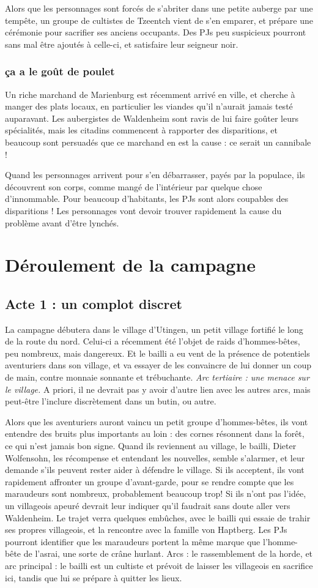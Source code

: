 \documentclass[10pt,a4paper]{book}
\begin{document}
Alors que les personnages sont forcés de s'abriter dans une petite auberge par une tempête, un groupe de cultistes de Tzeentch vient de s'en emparer, et prépare une cérémonie pour sacrifier ses anciens occupants. Des PJs peu suspicieux pourront sans mal être ajoutés à celle-ci, et satisfaire leur seigneur noir.
\subsection{ça a le goût de poulet}
Un riche marchand de Marienburg est récemment arrivé en ville, et cherche à manger des plats locaux, en particulier les viandes qu'il n'aurait jamais testé auparavant. Les aubergistes de Waldenheim sont ravis de lui faire goûter leurs spécialités, mais les citadins commencent à rapporter des disparitions, et beaucoup sont persuadés que ce marchand en est la cause : ce serait un cannibale !

Quand les personnages arrivent pour s'en débarrasser, payés par la populace, ils découvrent son corps, comme mangé de l'intérieur par quelque chose d'innommable. Pour beaucoup d'habitants, les PJs sont alors coupables des disparitions ! Les personnages vont devoir trouver rapidement la cause du problème avant d'être lynchés.
\chapter{Déroulement de la campagne}
\section{Acte 1 : un complot discret}
La campagne débutera dans le village d'Utingen, un petit village fortifié le long de la route du nord. Celui-ci a récemment été l'objet de raids d'hommes-bêtes, peu nombreux, mais dangereux. Et le bailli a eu vent de la présence de potentiels aventuriers dans son village, et va essayer de les convaincre de lui donner un coup de main, contre monnaie sonnante et trébuchante. \emph{Arc tertiaire : une menace sur le village.} A priori, il ne devrait pas y avoir d'autre lien avec les autres arcs, mais peut-être l'inclure discrètement dans un butin, ou autre. 

Alors que les aventuriers auront vaincu un petit groupe d'hommes-bêtes, ils vont entendre des bruits plus importants au loin : des cornes résonnent dans la forêt, ce qui n'est jamais bon signe. Quand ils reviennent au village, le bailli, Dieter Wolfensohn, les récompense et entendant les nouvelles, semble s'alarmer, et leur demande s'ils peuvent rester aider à défendre le village. Si ils acceptent, ils vont rapidement affronter un groupe d'avant-garde, pour se rendre compte que les maraudeurs sont nombreux, probablement beaucoup trop! Si ils n'ont pas l'idée, un villageois apeuré devrait leur indiquer qu'il faudrait sans doute aller vers Waldenheim. Le trajet verra quelques embûches, avec le bailli qui essaie de trahir ses propres villageois, et la rencontre avec la famille von Haptberg. Les PJs pourront identifier que les maraudeurs portent la même marque que l'homme-bête de l'asrai, une sorte de crâne hurlant. Arcs : le rassemblement de la horde, et arc principal : le bailli est un cultiste et prévoit de laisser les villageois en sacrifice ici, tandis que lui se prépare à quitter les lieux.
\end{document}
